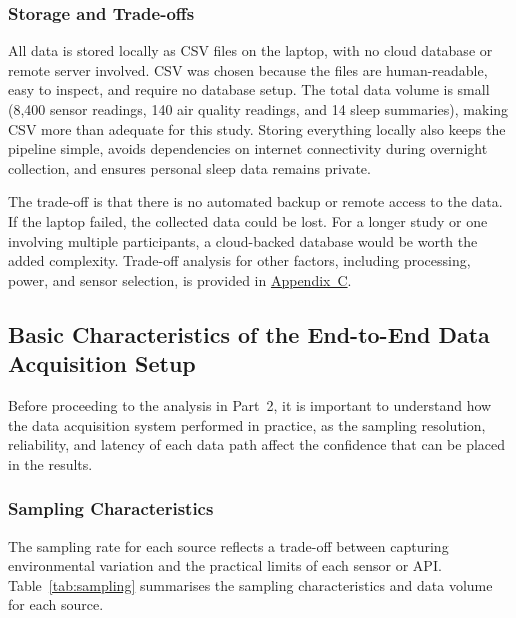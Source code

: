 \documentclass[10pt,a4paper]{extarticle}
\begin{document}
\subsubsection{Storage and Trade-offs}

All data is stored locally as CSV files on the laptop, with no cloud database or remote server involved. CSV was chosen because the files are human-readable, easy to inspect, and require no database setup. The total data volume is small (8,400 sensor readings, 140 air quality readings, and 14 sleep summaries), making CSV more than adequate for this study. Storing everything locally also keeps the pipeline simple, avoids dependencies on internet connectivity during overnight collection, and ensures personal sleep data remains private.

The trade-off is that there is no automated backup or remote access to the data. If the laptop failed, the collected data could be lost. For a longer study or one involving multiple participants, a cloud-backed database would be worth the added complexity. Trade-off analysis for other factors, including processing, power, and sensor selection, is provided in \hyperref[app:C]{Appendix~C}.

\subsection{Basic Characteristics of the End-to-End Data Acquisition Setup}

Before proceeding to the analysis in Part~2, it is important to understand how the data acquisition system performed in practice, as the sampling resolution, reliability, and latency of each data path affect the confidence that can be placed in the results.

\subsubsection{Sampling Characteristics}

The sampling rate for each source reflects a trade-off between capturing environmental variation and the practical limits of each sensor or API. Table~\ref{tab:sampling} summarises the sampling characteristics and data volume for each source.
\end{document}
